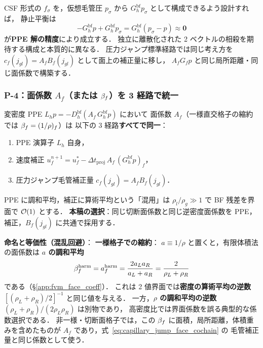 CSF 形式の $f_\sigma$ を，仮想毛管圧 $p_\sigma$ から
$G_h^\text{bf} p_\sigma$ として構成できるよう設計すれば，
静止平衡は
\begin{equation}
  -G_h^\text{bf} p + G_h^\text{bf} p_\sigma
    = G_h^\text{bf}(p_\sigma - p) \approx \mathbf{0}
  \label{eq:bf_p3_cancel}
\end{equation}
が\textbf{PPE 解の精度}により成立する．
独立に離散化された 2 ベクトルの相殺を期待する構成と本質的に異なる．
圧力ジャンプ標準経路では同じ考え方を
$c_f(j_{gl})=A_f B_f(j_{gl})$ として面上の補正量に移し，
$A_f G_f p$ と同じ局所距離・同じ面係数で構築する．

\subsubsection{\texorpdfstring{P-4：面係数 $A_f$（または $\beta_{f}$）を 3 経路で統一}{P-4：面係数 Af（または beta f）を 3 経路で統一}}
\label{sec:bf_p4_beta}

変密度 PPE $L_h p = -D_h^\text{bf}(A_f\,G_h^\text{bf} p)$ において
面係数 $A_f$（一様直交格子の縮約では $\beta_{f}=(1/\rho)_f$）は
以下の 3 経路\textbf{すべてで同一}：
\begin{enumerate}[leftmargin=2em,noitemsep]
  \item PPE 演算子 $L_h$ 自身，
  \item 速度補正 $u_f^{n+1} = u_f^* - \Delta t_{\mathrm{proj}}\,A_f\,(G_h^\text{bf} p)_f$，
  \item 圧力ジャンプ毛管補正量
        $c_f(j_{gl})=A_f B_f(j_{gl})$．
\end{enumerate}
PPE に調和平均，補正に算術平均という「混用」は
$\rho_l/\rho_g \gg 1$ で BF 残差を界面で $\mathcal{O}(1)$ とする．
\textbf{本稿の選択}：同じ切断面係数と同じ逆密度面係数を
PPE，補正，$B_f(j_{gl})$ に共通で採用する．

\smallskip\noindent\textbf{命名と等価性（混乱回避）}：
\noindent\textbf{一様格子での縮約}：
$a\equiv 1/\rho$ と置くと，有限体積法の面係数は
\textbf{$a$ の調和平均}
\begin{equation}
  \beta_{f}^\text{harm}
  = a_f^\text{harm}
  = \frac{2a_La_R}{a_L+a_R}
  = \frac{2}{\rho_L+\rho_R}
  \label{eq:bf_beta_harmonic}
\end{equation}
である（§\ref{app:fvm_face_coeff}）．
これは 2 値界面では\textbf{密度の算術平均の逆数}
$[(\rho_L+\rho_R)/2]^{-1}$ と同じ値を与える．
一方，\textbf{$\rho$ の調和平均の逆数}
$(\rho_L+\rho_R)/(2\rho_L\rho_R)$ は別物であり，
高密度比では界面係数を誤る典型的な係数選択である．
非一様・切断面格子では，この $\beta_{f}$ に面積，局所距離，体積重みを含めたものが
$A_f$ であり，式~\eqref{eq:capillary_jump_face_cochain} の
毛管補正量と同じ係数として使う．

